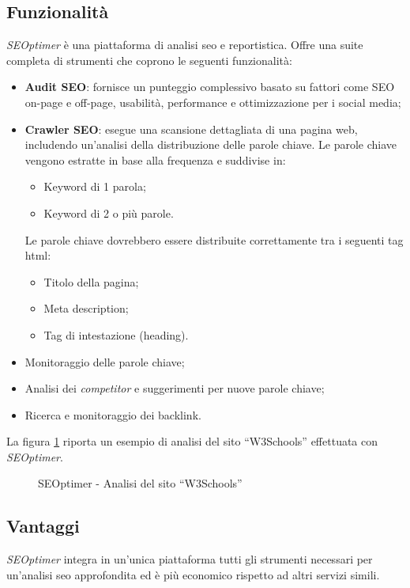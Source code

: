 \subsection{Funzionalità}
\textit{SEOptimer} è una piattaforma di analisi \gls{seo} e reportistica. Offre una suite completa di strumenti che coprono le seguenti funzionalità:
\begin{itemize}
    \item \textbf{Audit SEO}: fornisce un punteggio complessivo basato su fattori come SEO \gls{on-page} e \gls{off-page}, usabilità, performance e ottimizzazione per i social media;
    \item \textbf{Crawler SEO}: esegue una scansione dettagliata di una pagina web, includendo un'analisi della distribuzione delle parole chiave. Le parole chiave vengono estratte in base alla frequenza e suddivise in:
    \begin{itemize}
        \item Keyword di 1 parola;
        \item Keyword di 2 o più parole.
    \end{itemize}
    Le parole chiave dovrebbero essere distribuite correttamente tra i seguenti tag \gls{html}: 
    \begin{itemize}
        \item Titolo della pagina;
        \item Meta description;
        \item Tag di intestazione (heading).
    \end{itemize}
    \item Monitoraggio delle parole chiave;
    \item Analisi dei \textit{competitor} e suggerimenti per nuove parole chiave;
    \item Ricerca e monitoraggio dei \gls{backlink}.
\end{itemize}

\vspace{10pt}
\noindent La figura \ref{fig:seoptimer_w3schools} riporta un esempio di analisi del sito “W3Schools” effettuata con \textit{SEOptimer}.

\begin{figure}[H]
    \centering 
    \caption{SEOptimer - Analisi del sito “W3Schools”}
    \label{fig:seoptimer_w3schools}
\end{figure}

\subsection{Vantaggi}
\textit{SEOptimer} integra in un'unica piattaforma tutti gli strumenti necessari per un'analisi \gls{seo} approfondita ed è più economico rispetto ad altri servizi simili.

